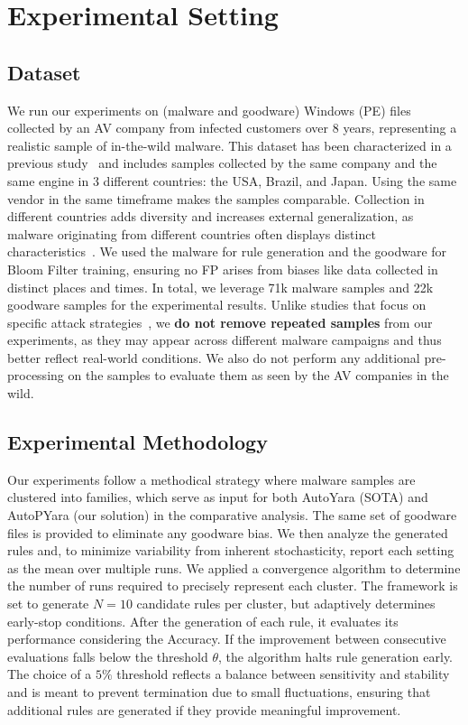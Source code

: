 \section{Experimental Setting} 
\label{sec:exp}
\subsection{Dataset}

\noindent We run our experiments on (malware and goodware) Windows (PE) files collected by an AV company from infected customers over 8 years, representing a realistic sample of in-the-wild malware. This dataset has been characterized in a previous study~\cite{botacin2021_bbsample} and includes samples collected by the same company and the same engine in 3 different countries: the USA, Brazil, and Japan. Using the same vendor in the same timeframe makes the samples comparable. Collection in different countries adds diversity and increases external generalization, as malware originating from different countries often displays distinct characteristics~\cite{10.1145/3678890.3678893}. We used the malware for rule generation and the goodware for Bloom Filter training, ensuring no FP arises from biases like data collected in distinct places and times. In total, we leverage 71k malware samples and 22k goodware samples for the experimental results. Unlike studies that focus on specific attack strategies~\cite{10.1145/3708821.3736206,10460021}, we \textbf{do not remove repeated samples} from our experiments, as they may appear across different malware campaigns and thus better reflect real-world conditions. We also do not perform any additional pre-processing on the samples to evaluate them as seen by the AV companies in the wild.




\subsection{Experimental Methodology}
\label{subsec:expmeth}



\noindent Our experiments follow a methodical strategy where malware samples are clustered into families, which serve as input for both AutoYara (SOTA) and AutoPYara (our solution) in the comparative analysis. The same set of goodware files is provided to eliminate any goodware bias. We then analyze the generated rules and, to minimize variability from inherent stochasticity, report each setting as the mean over multiple runs. We applied a convergence algorithm to determine the number of runs required to precisely represent each cluster. The framework is set to generate $N=10$ candidate rules per cluster, but adaptively determines early-stop conditions. After the generation of each rule, it evaluates its performance considering the Accuracy. If the improvement between consecutive evaluations falls below the threshold $\theta$, the algorithm halts rule generation early. The choice of a $5\%$ threshold reflects a balance between sensitivity and stability and is meant to prevent termination due to small fluctuations, ensuring that additional rules are generated if they provide meaningful improvement.


